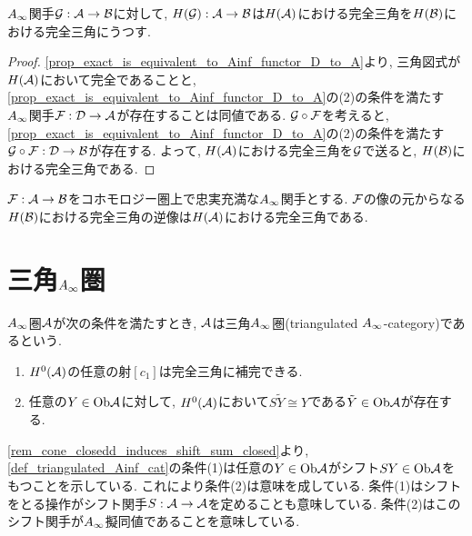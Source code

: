 \documentclass[uplatex, a4paper, 14Q, dvipdfmx]{jsarticle}
\begin{document}
\begin{corollary} \label{prop_exact_maps_to_exact}
  $\Ainf$関手$\mathcal{G} : \mathcal{A} \to \mathcal{B}$に対して, $H(\mathcal{G}) : \mathcal{A} \to \mathcal{B}$は$H(\mathcal{A})$における完全三角を$H(\mathcal{B})$における完全三角にうつす.
\end{corollary}

\begin{proof}
  \cref{prop_exact_is_equivalent_to_Ainf_functor_D_to_A}より, 三角図式が$H(\mathcal{A})$において完全であることと, \cref{prop_exact_is_equivalent_to_Ainf_functor_D_to_A}の(2)の条件を満たす$\Ainf$関手$\mathcal{F} : \mathcal{D} \to \mathcal{A}$が存在することは同値である. 
  $\mathcal{G} \circ \mathcal{F}$を考えると, \cref{prop_exact_is_equivalent_to_Ainf_functor_D_to_A}の(2)の条件を満たす$\mathcal{G} \circ \mathcal{F} : \mathcal{D} \to \mathcal{B}$が存在する.
  よって, $H(\mathcal{A})$における完全三角を$\mathcal{G}$で送ると, $H(\mathcal{B})$における完全三角である.
\end{proof}

\begin{corollary}
  $\mathcal{F} : \mathcal{A} \to \mathcal{B}$をコホモロジー圏上で忠実充満な$\Ainf$関手とする.
  $\mathcal{F}$の像の元からなる$H(\mathcal{B})$における完全三角の逆像は$H(\mathcal{A})$における完全三角である.
\end{corollary}

\section{三角\texorpdfstring{$\Ainf$}{Ainf}圏}

\begin{definition}[三角$\Ainf$圏] \label{def_triangulated_Ainf_cat}
  $\Ainf$圏$\mathcal{A}$が次の条件を満たすとき, $\mathcal{A}$は三角$\Ainf$圏(triangulated $\Ainf$-category)であるという. 
  \begin{enumerate}
    \item $H^0(\mathcal{A})$の任意の射$[c_1]$は完全三角に補完できる.
    \item 任意の$Y \in \mathrm{Ob}\mathcal{A}$に対して, $H^0(\mathcal{A})$において$S\tilde{Y} \cong Y$である$\tilde{Y} \in \mathrm{Ob}\mathcal{A}$が存在する.  
  \end{enumerate}
\end{definition}

\begin{remark}
  \cref{rem_cone_closedd_induces_shift_sum_closed}より, \cref{def_triangulated_Ainf_cat}の条件(1)は任意の$Y \in \mathrm{Ob}\mathcal{A}$がシフト$SY \in \mathrm{Ob}\mathcal{A}$をもつことを示している.
  これにより条件(2)は意味を成している. 
  条件(1)はシフトをとる操作がシフト関手$S : \mathcal{A} \to \mathcal{A}$を定めることも意味している. 
  条件(2)はこのシフト関手が$\Ainf$擬同値であることを意味している. 
\end{remark}
\end{document}

